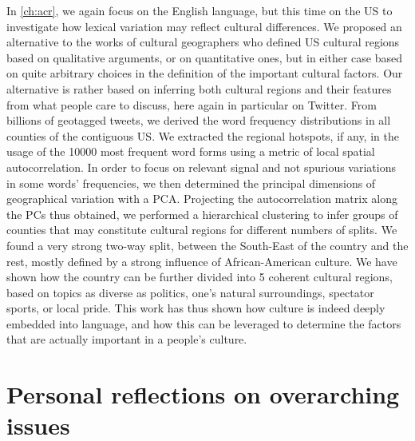 \documentclass[../thesis.tex]{subfiles}
\begin{document}
In \cref{ch:acr}, we again focus on the English language, but this time on the US to
investigate how lexical variation may reflect cultural differences. We proposed an
alternative to the works of cultural geographers who defined US cultural regions based
on qualitative arguments, or on quantitative ones, but in either case based on quite
arbitrary choices in the definition of the important cultural factors. Our alternative
is rather based on inferring both cultural regions and their features from what people
care to discuss, here again in particular on Twitter. From billions of geotagged tweets,
we derived the word frequency distributions in all counties of the contiguous US. We
extracted the regional hotspots, if any, in the usage of the \SI{10000}{} most frequent
word forms using a metric of local spatial autocorrelation. In order to focus on
relevant signal and not spurious variations in some words' frequencies, we then
determined the principal dimensions of geographical variation with a \ac{PCA}.
Projecting the autocorrelation matrix along the \acp{PC} thus obtained, we performed a
hierarchical clustering to infer groups of counties that may constitute cultural regions
for different numbers of splits. We found a very strong two-way split, between the
South-East of the country and the rest, mostly defined by a strong influence of
African-American culture. We have shown how the country can be further divided into 5
coherent cultural regions, based on topics as diverse as politics, one's natural
surroundings, spectator sports, or local pride. This work has thus shown how culture is
indeed deeply embedded into language, and how this can be leveraged to determine the
factors that are actually important in a people's culture.



\section{Personal reflections on overarching issues}
\end{document}
